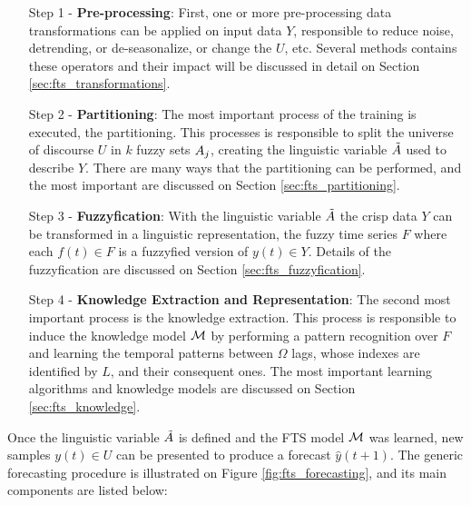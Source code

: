 \begin{enumerate}
    \item[Step 1] - \textbf{Pre-processing}: First, one or more pre-processing data transformations can be applied on input data $Y$, responsible to reduce noise, detrending, or de-seasonalize, or change the $U$, etc. Several methods contains these operators and their impact will be discussed in detail on Section \ref{sec:fts_transformations}.
    
    \item[Step 2] - \textbf{Partitioning}: The most important process of the training is executed, the partitioning. This processes is responsible to split the universe of discourse $U$ in $k$ fuzzy sets $A_j$, creating the linguistic variable $\tilde{A}$ used to describe $Y$. There are many ways that the partitioning can be performed, and the most important are discussed on Section \ref{sec:fts_partitioning}.
    
    \item[Step 3] - \textbf{Fuzzyfication}: With the linguistic variable $\tilde{A}$ the crisp data $Y$ can be transformed in a linguistic representation, the fuzzy time series $F$ where each $f(t) \in F$ is a fuzzyfied version of $y(t) \in Y$. Details of the fuzzyfication are discussed on Section \ref{sec:fts_fuzzyfication}.
    
    \item[Step 4] - \textbf{Knowledge Extraction and Representation}: The second most important process is the knowledge extraction. This process is responsible to induce the knowledge model $\mathcal{M}$ by performing a pattern recognition over $F$ and learning the temporal patterns between  $\Omega$ lags, whose indexes are identified by $L$, and their consequent ones. The most important learning algorithms and knowledge models are discussed on Section \ref{sec:fts_knowledge}.
\end{enumerate}

Once the linguistic variable $\tilde{A}$ is defined and the FTS model $\mathcal{M}$ was learned, new samples $y(t) \in U$ can be presented to produce a forecast $\hat{y}(t+1)$. The generic forecasting procedure is illustrated on Figure \ref{fig:fts_forecasting}, and its main components are listed below:


